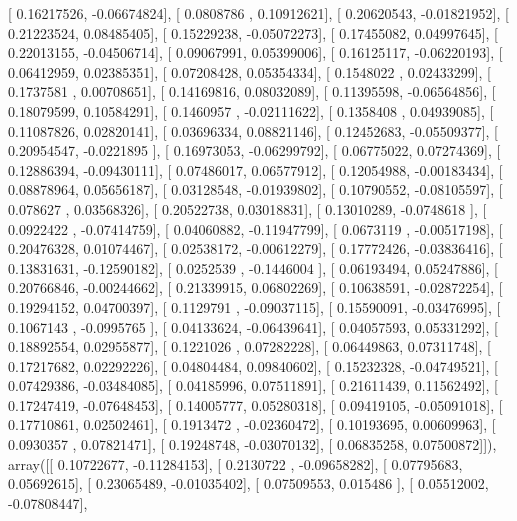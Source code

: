 \documentclass{article}
\begin{document}
       [ 0.16217526, -0.06674824],
       [ 0.0808786 ,  0.10912621],
       [ 0.20620543, -0.01821952],
       [ 0.21223524,  0.08485405],
       [ 0.15229238, -0.05072273],
       [ 0.17455082,  0.04997645],
       [ 0.22013155, -0.04506714],
       [ 0.09067991,  0.05399006],
       [ 0.16125117, -0.06220193],
       [ 0.06412959,  0.02385351],
       [ 0.07208428,  0.05354334],
       [ 0.1548022 ,  0.02433299],
       [ 0.1737581 ,  0.00708651],
       [ 0.14169816,  0.08032089],
       [ 0.11395598, -0.06564856],
       [ 0.18079599,  0.10584291],
       [ 0.1460957 , -0.02111622],
       [ 0.1358408 ,  0.04939085],
       [ 0.11087826,  0.02820141],
       [ 0.03696334,  0.08821146],
       [ 0.12452683, -0.05509377],
       [ 0.20954547, -0.0221895 ],
       [ 0.16973053, -0.06299792],
       [ 0.06775022,  0.07274369],
       [ 0.12886394, -0.09430111],
       [ 0.07486017,  0.06577912],
       [ 0.12054988, -0.00183434],
       [ 0.08878964,  0.05656187],
       [ 0.03128548, -0.01939802],
       [ 0.10790552, -0.08105597],
       [ 0.078627  ,  0.03568326],
       [ 0.20522738,  0.03018831],
       [ 0.13010289, -0.0748618 ],
       [ 0.0922422 , -0.07414759],
       [ 0.04060882, -0.11947799],
       [ 0.0673119 , -0.00517198],
       [ 0.20476328,  0.01074467],
       [ 0.02538172, -0.00612279],
       [ 0.17772426, -0.03836416],
       [ 0.13831631, -0.12590182],
       [ 0.0252539 , -0.1446004 ],
       [ 0.06193494,  0.05247886],
       [ 0.20766846, -0.00244662],
       [ 0.21339915,  0.06802269],
       [ 0.10638591, -0.02872254],
       [ 0.19294152,  0.04700397],
       [ 0.1129791 , -0.09037115],
       [ 0.15590091, -0.03476995],
       [ 0.1067143 , -0.0995765 ],
       [ 0.04133624, -0.06439641],
       [ 0.04057593,  0.05331292],
       [ 0.18892554,  0.02955877],
       [ 0.1221026 ,  0.07282228],
       [ 0.06449863,  0.07311748],
       [ 0.17217682,  0.02292226],
       [ 0.04804484,  0.09840602],
       [ 0.15232328, -0.04749521],
       [ 0.07429386, -0.03484085],
       [ 0.04185996,  0.07511891],
       [ 0.21611439,  0.11562492],
       [ 0.17247419, -0.07648453],
       [ 0.14005777,  0.05280318],
       [ 0.09419105, -0.05091018],
       [ 0.17710861,  0.02502461],
       [ 0.1913472 , -0.02360472],
       [ 0.10193695,  0.00609963],
       [ 0.0930357 ,  0.07821471],
       [ 0.19248748, -0.03070132],
       [ 0.06835258,  0.07500872]]), array([[ 0.10722677, -0.11284153],
       [ 0.2130722 , -0.09658282],
       [ 0.07795683,  0.05692615],
       [ 0.23065489, -0.01035402],
       [ 0.07509553,  0.015486  ],
       [ 0.05512002, -0.07808447],
\end{document}
